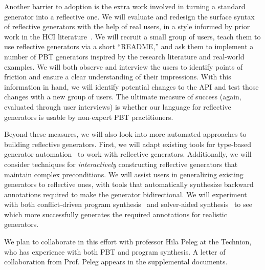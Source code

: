 Another barrier to adoption is the extra work involved in turning a standard
generator into a reflective one.
We will evaluate and redesign the surface syntax of reflective generators with
the help of real users, in a style informed by prior work in the HCI
literature~\cite{ref:ko2015practical}.  We will recruit a small group of users, teach
them to use reflective generators via a short ``README,'' and ask
them to implement a number of PBT generators inspired by the research
literature and real-world examples. We will both observe and interview
the users to identify points of friction and ensure a clear understanding of their
impressions. With this information in hand, we will identify potential changes
to the API and test those changes with a new group of users.  The
ultimate measure of success (again, evaluated through user interviews)
is whether our language for reflective generators is usable by non-expert PBT
practitioners.

Beyond these measures, we will also look into more automated approaches to
building reflective generators.
First, we will adapt existing tools for type-based generator
automation~\cite{mista2019deriving} to work with reflective generators.
Additionally, we will consider techniques for {\em interactively} constructing
reflective generators that maintain complex preconditions.
We will assist
users in generalizing existing generators to reflective ones, with tools that automatically synthesize backward annotations
required to make the generator bidirectional. We will experiment with both
conflict-driven program synthesis~\cite{feng_program_2018} and solver-aided
synthesis~\cite{torlak_growing_2013} to see which more successfully generates
the required annotations for realistic generators.

We plan to collaborate in this effort with professor Hila
Peleg at the Technion, who has experience with both PBT and program synthesis. A
letter of collaboration from Prof.{} Peleg appears in the supplemental documents.


